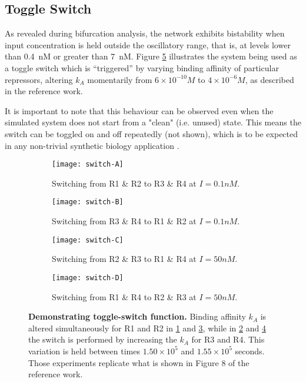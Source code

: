   \subsection{Toggle Switch}

    As revealed during bifurcation analysis, the network exhibits bistability when input concentration is held outside the oscillatory range, that is, at levels lower than \SI{0.4}{\nano M} or greater than \SI{7}{\nano M}.
    Figure \ref{fig:switch} illustrates the system being used as a toggle switch which is ``triggered'' by varying binding affinity of particular repressors, altering $k_A$ momentarily from $6 \times 10^{-10} M$ to $4 \times 10^{-6} M$, as described in the reference work.

    It is important to note that this behaviour can be observed even when the simulated system does not start from a "clean" (i.e. unused) state.
    This means the switch can be toggled on and off repeatedly (not shown), which is to be expected in any non-trivial synthetic biology application \cite{reconfgate}.

    \begin{figure}[!htb]
      \centering
      \begin{subfigure}[t]{0.48\textwidth}
        \centering
        \texttt{[image: switch-A]}
        \caption{Switching from R1 \& R2 to R3 \& R4 at $I = 0.1 nM$.}
        \label{fig:switch-A}
      \end{subfigure}
      \hfill
      \begin{subfigure}[t]{0.48\textwidth}
        \centering
        \texttt{[image: switch-B]}
        \caption{Switching from R3 \& R4 to R1 \& R2 at $I = 0.1 nM$.}
        \label{fig:switch-B}
      \end{subfigure}
      \medskip
      \begin{subfigure}[t]{0.48\textwidth}
        \centering
        \texttt{[image: switch-C]}
        \caption{Switching from R2 \& R3 to R1 \& R4 at $I = 50 nM$.}
        \label{fig:switch-C}
      \end{subfigure}
      \hfill
      \begin{subfigure}[t]{0.48\textwidth}
        \centering
        \texttt{[image: switch-D]}
        \caption{Switching from R1 \& R4 to R2 \& R3 at $I = 50 nM$.}
        \label{fig:switch-D}
      \end{subfigure}
      \caption{\textbf{Demonstrating toggle-switch function.} Binding affinity $k_A$ is altered simultaneously for R1 and R2 in \ref{fig:switch-A} and \ref{fig:switch-C}, while in \ref{fig:switch-B} and \ref{fig:switch-D} the switch is performed by increasing the $k_A$ for R3 and R4. This variation is held between times $1.50 \times 10^5$ and $1.55 \times 10^5$ seconds. Those experiments replicate what is shown in Figure 8 of the reference work.}
      \label{fig:switch}
    \end{figure}


